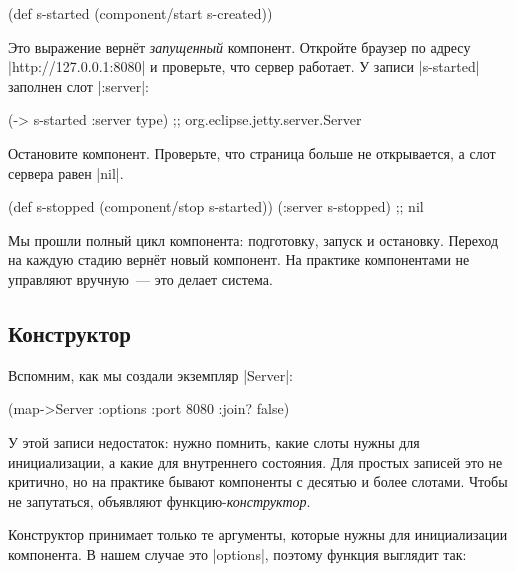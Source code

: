 \begin{english}
  \begin{clojure}
(def s-started (component/start s-created))
  \end{clojure}
\end{english}

Это выражение верн\"{е}т \emph{запущенный} компонент. Откройте браузер по адресу
\spverb|http://127.0.0.1:8080| и проверьте, что сервер работает. У записи
\spverb|s-started| заполнен слот \spverb|:server|:

\begin{english}
  \begin{clojure}
(-> s-started :server type)
;; org.eclipse.jetty.server.Server
  \end{clojure}
\end{english}

Остановите компонент. Проверьте, что страница больше не открывается, а слот
сервера равен \spverb|nil|.

\begin{english}
  \begin{clojure}
(def s-stopped (component/stop s-started))
(:server s-stopped) ;; nil
  \end{clojure}
\end{english}

Мы прошли полный цикл компонента: подготовку, запуск и остановку. Переход на
каждую стадию верн\"{е}т новый компонент. На практике компонентами не управляют
вручную~--- это делает система.

\subsection{Конструктор}

Вспомним, как мы создали экземпляр \spverb|Server|:

\begin{english}
  \begin{clojure}
(map->Server {:options {:port 8080 :join? false}})
  \end{clojure}
\end{english}

У этой записи недостаток: нужно помнить, какие слоты нужны для инициализации, а
какие для внутреннего состояния. Для простых записей это не критично, но на
практике бывают компоненты с десятью и более слотами. Чтобы не запутаться,
объявляют функцию-\emph{конструктор}.

Конструктор принимает только те аргументы, которые нужны для инициализации
компонента. В нашем случае это \spverb|options|, поэтому функция выглядит так:

